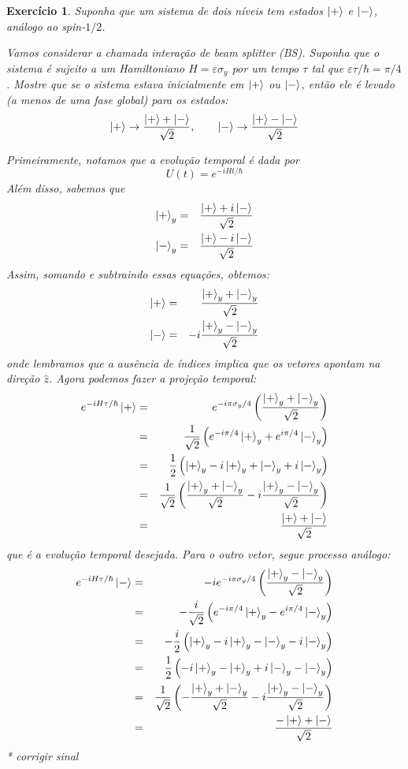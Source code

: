 \documentclass[12pt]{article}
\def\be{\begin{equation}}
\def\ee{\end{equation}}
\def\bea{\begin{eqnarray*}}
\def\eea{\end{eqnarray*}}
\def\f{\frac}
\def\l{\left}
\def\r{\right}
\newtheorem{exercise}{Exercício}
\begin{document}
	\begin{exercise}
		Suponha que um sistema de dois níveis tem estados $\ket{+}$ e $\ket{-}$, análogo ao spin-$1/2$. 
		\begin{exercises}
			\item Vamos considerar a chamada interação de beam splitter (BS). Suponha que o
			sistema é sujeito a um Hamiltoniano $H=\varepsilon\sigma_y$ por um tempo $\tau$ tal que $\varepsilon\tau/\hbar = \pi/4$. Mostre que se o sistema estava inicialmente em $\ket{+}$ ou $\ket{-}$, então ele é levado (a menos de uma fase global) para os estados:
			\be
				\ket{+} \to \f{\ket{+}+\ket{-}}{\sqrt{2}}, \quad\quad \ket{-} \to \f{\ket{+} - \ket{-}}{\sqrt{2}}
			\ee
			\begin{multianswer}
				Primeiramente, notamos que a evolução temporal é dada por
				\be
					U(t) = e^{-iHt/\hbar}
				\ee
				Além disso, sabemos que
				\bea
					\ket{+}_y &=& \f{\ket{+} + i\ket{-}}{\sqrt{2}} \\
					\ket{-}_y &=& \f{\ket{+} - i\ket{-}}{\sqrt{2}} 
				\eea
				Assim, somando e subtraindo essas equações, obtemos:
				\bea
					\ket{+} &=& \f{\ket{+}_y + \ket{-}_y}{\sqrt{2}} \\
					\ket{-} &=& -i \f{\ket{+}_y - \ket{-}_y}{\sqrt{2}} 
				\eea	
				onde lembramos que a ausência de índices implica que os vetores apontam na direção $\hat{z}$. Agora podemos fazer a projeção temporal:
				\bea
					e^{-iH\tau/\hbar}\ket{+} &=& e^{-i\pi\sigma_y/4} \l( \f{\ket{+}_y + \ket{-}_y}{\sqrt{2}}\r) \\
						&=& \f{1}{\sqrt{2}} \l( e^{-i\pi/4}\ket{+}_y + e^{i\pi/4}\ket{-}_y \r) \\
						&=& \f{1}{2} \l( \ket{+}_y - i\ket{+}_y + \ket{-}_y +i\ket{-}_y \r) \\
						&=& \f{1}{\sqrt{2}} \l( \f{\ket{+}_y + \ket{-}_y}{\sqrt{2}} -i \f{ \ket{+}_y - \ket{-}_y}{\sqrt{2}} \r) \\
						&=& \f{\ket{+} + \ket{-}}{\sqrt{2}} 
				\eea
				que é a evolução temporal desejada. Para o outro vetor, segue processo análogo:
				\bea
					e^{-iH\tau/\hbar}\ket{-} &=& -i e^{-i\pi\sigma_y/4} \l( \f{\ket{+}_y - \ket{-}_y}{\sqrt{2}}\r) \\	
						&=& -\f{i}{\sqrt{2}} \l( e^{-i\pi/4}\ket{+}_y - e^{i\pi/4}\ket{-}_y \r) \\
						&=& -\f{i}{2} \l( \ket{+}_y - i\ket{+}_y - \ket{-}_y - i\ket{-}_y \r) \\
						&=& \f{1}{2} \l( -i\ket{+}_y - \ket{+}_y + i\ket{-}_y - \ket{-}_y \r) \\
						&=& \f{1}{\sqrt{2}} \l( - \f{\ket{+}_y + \ket{-}_y}{\sqrt{2}} -i \f{\ket{+}_y - \ket{-}_y}{\sqrt{2}} \r) \\
						&=& \f{-\ket{+} + \ket{-}}{\sqrt{2}} 
				\eea
				* corrigir sinal
			\end{multianswer}
			

\end{exercises}
\end{exercise}
\end{document}

